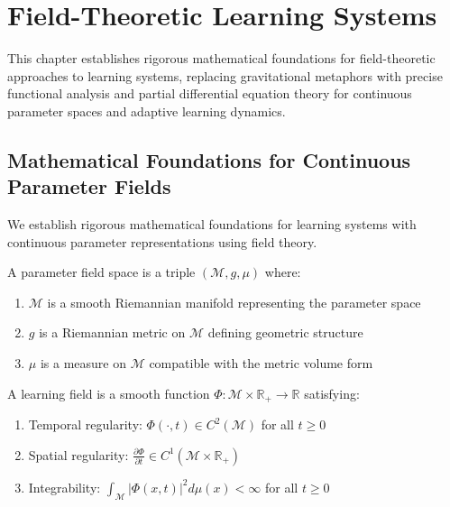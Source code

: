 \chapter{Field-Theoretic Learning Systems}

\begin{tcolorbox}[colback=DarkSkyBlue!5!white,colframe=DarkSkyBlue!75!black,title=Chapter Summary]
This chapter establishes rigorous mathematical foundations for field-theoretic approaches to learning systems, replacing gravitational metaphors with precise functional analysis and partial differential equation theory for continuous parameter spaces and adaptive learning dynamics.
\end{tcolorbox}

\section{Mathematical Foundations for Continuous Parameter Fields}

We establish rigorous mathematical foundations for learning systems with continuous parameter representations using field theory.

\begin{definition}
\label{def:parameter_field_space}
A parameter field space is a triple $(\mathcal{M}, g, \mu)$ where:
\begin{enumerate}
\item $\mathcal{M}$ is a smooth Riemannian manifold representing the parameter space
\item $g$ is a Riemannian metric on $\mathcal{M}$ defining geometric structure
\item $\mu$ is a measure on $\mathcal{M}$ compatible with the metric volume form
\end{enumerate}
\end{definition}

\begin{definition}
\label{def:learning_field}
A learning field is a smooth function $\Phi: \mathcal{M} \times \mathbb{R}_+ \to \mathbb{R}$ satisfying:
\begin{enumerate}
\item Temporal regularity: $\Phi(\cdot, t) \in C^2(\mathcal{M})$ for all $t \geq 0$
\item Spatial regularity: $\frac{\partial \Phi}{\partial t} \in C^1(\mathcal{M} \times \mathbb{R}_+)$
\item Integrability: $\int_{\mathcal{M}} |\Phi(x,t)|^2 d\mu(x) < \infty$ for all $t \geq 0$
\end{enumerate}
\end{definition}

